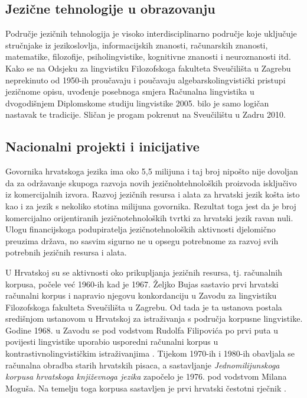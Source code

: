 \begin{multicols}{2}
\subsection{Jezične tehnologije u obrazovanju}

Područje jezičnih tehnologija je visoko interdisciplinarno područje koje uključuje stručnjake iz jezikoslovlja, informacijskih znanosti, računarskih znanosti, matematike, filozofije, psiholingvistike, kognitivne znanosti i neuroznanosti itd. Kako se na Odsjeku za lingvistiku Filozofskoga fakulteta Sveučilišta u Zagrebu neprekinuto od 1950-ih proučavaju i poučavaju algebarskolingvistički pristupi jezičnome opisu, uvođenje posebnoga smjera Računalna lingvistika u dvogodišnjem Diplomskome studiju lingvistike 2005. bilo je samo logičan nastavak te tradicije. Sličan je progam pokrenut na Sveučilištu u Zadru 2010.

\subsection{Nacionalni projekti i inicijative}

Govornika hrvatskoga jezika ima oko 5,5 milijuna i taj broj nipošto nije dovoljan da za održavanje skupoga razvoja novih jezičnohtehnoloških proizvoda isključivo iz komercijalnih izvora. Razvoj jezičnih resursa i alata za hrvatski jezik košta isto kao i za jezik s nekoliko stotina milijuna govornika. Rezultat toga jest da je broj komercijalno orijentiranih jezičnotehnoloških tvrtki za hrvatski jezik ravan nuli. Ulogu financijskoga podupiratelja jezičnotehnoloških aktivnosti djelomično preuzima država, no sasvim sigurno ne u opsegu potrebnome za razvoj svih potrebnih jezičnih resursa i alata.


U Hrvatskoj su se aktivnosti oko prikupljanja jezičnih resursa, tj. računalnih
korpusa, počele već 1960-ih kad je 1967. Željko Bujas sastavio prvi hrvatski
računalni korpus i napravio njegovu konkordanciju \cite{boo3} u Zavodu za
lingvistiku Filozofskoga fakulteta Sveučilišta u Zagrebu. Od tada je ta
ustanova postala središnjom ustanovom u Hrvatskoj za istraživanja s područja
korpusne lingvistike. Godine 1968. u Zavodu se pod vodstvom Rudolfa Filipovića
po prvi puta u povijesti lingvistike uporabio usporedni računalni korpus u
kontrastivnolingvističkim istraživanjima \cite{art7}. Tijekom 1970-ih i 1980-ih
obavljala se računalna obradba starih hrvatskih pisaca, a sastavljanje
\emph{Jednomilijunskoga korpusa hrvatskoga književnoga jezika} započelo je
1976. pod vodstvom Milana Moguša. Na temelju toga korpusa sastavljen je prvi
hrvatski čestotni rječnik \cite{boo4}.


\end{multicols}

